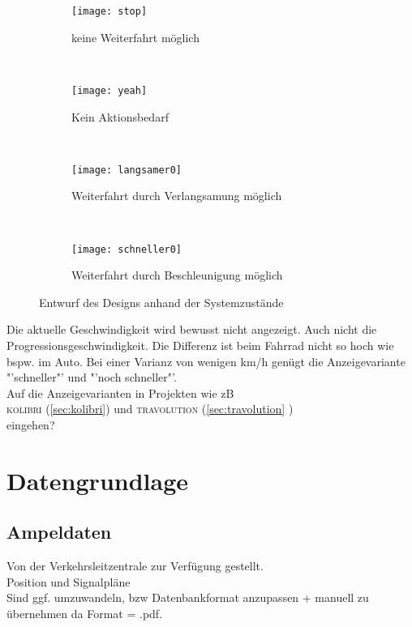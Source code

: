 \begin{figure}[H]
        \centering
           \begin{subfigure}[t]{0.23\textwidth}
                \texttt{[image: stop]}
                \caption[Systemzustand a]{keine Weiterfahrt möglich}
                \label{fig:stop}
        \end{subfigure}
           ~ 
              \begin{subfigure}[t]{0.23\textwidth}
                \texttt{[image: yeah]}
                \caption[Systemzustand b]{Kein Aktionsbedarf}
                \label{fig:yeah}
        \end{subfigure}
           ~
        \begin{subfigure}[t]{0.23\textwidth}
                \texttt{[image: langsamer0]}
                \caption[Systemzustand c]{Weiterfahrt durch Verlangsamung  möglich}
                \label{fig:langsamer}
        \end{subfigure}
        ~
        \begin{subfigure}[t]{0.23\textwidth}
                \texttt{[image: schneller0]}
                \caption[Systemzustand d]{Weiterfahrt durch Beschleunigung möglich}
                \label{fig:schneller}
        \end{subfigure}     
        \caption[Systemzustände im Ampelbereich]{Entwurf des Designs anhand der Systemzustände}
        \label{fig:mockup}
\end{figure} 
Die aktuelle Geschwindigkeit wird bewusst nicht angezeigt. Auch nicht die Progressionsgeschwindigkeit. Die Differenz ist beim Fahrrad nicht so hoch wie bspw. im Auto. Bei einer Varianz von wenigen km/h genügt die Anzeigevariante "'schneller"' und "'noch schneller"'.\\
Auf die Anzeigevarianten in Projekten wie zB\\
\textsc{kolibri} (\ref{sec:kolibri}) und \textsc{travolution} (\ref{sec:travolution} )\\ eingehen? 

\section{Datengrundlage}
\subsection{Ampeldaten}
Von der Verkehrsleitzentrale zur Verfügung gestellt.\\
Position und Signalpläne\\
Sind ggf. umzuwandeln, bzw Datenbankformat anzupassen + manuell zu übernehmen da Format = .pdf.\\
